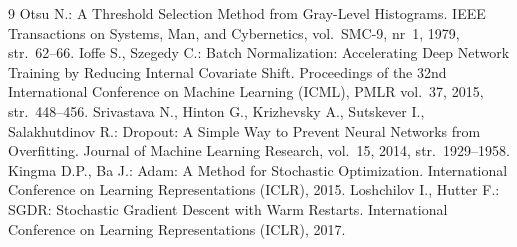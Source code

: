 \documentclass[12pt, twoside, openright]{article}
\begin{document}
\begin{thebibliography}{9}
 Otsu N.: A Threshold Selection Method from Gray-Level Histograms. IEEE Transactions on Systems, Man, and Cybernetics, vol.~SMC-9, nr~1, 1979, str.~62--66.
 Ioffe S., Szegedy C.: Batch Normalization: Accelerating Deep Network Training by Reducing Internal Covariate Shift. Proceedings of the 32nd International Conference on Machine Learning (ICML), PMLR vol.~37, 2015, str.~448--456.
 Srivastava N., Hinton G., Krizhevsky A., Sutskever I., Salakhutdinov R.: Dropout: A Simple Way to Prevent Neural Networks from Overfitting. Journal of Machine Learning Research, vol.~15, 2014, str.~1929--1958.
 Kingma D.P., Ba J.: Adam: A Method for Stochastic Optimization. International Conference on Learning Representations (ICLR), 2015.
 Loshchilov I., Hutter F.: SGDR: Stochastic Gradient Descent with Warm Restarts. International Conference on Learning Representations (ICLR), 2017.

\end{thebibliography}

\clearpage
\makesummary
\end{document}
